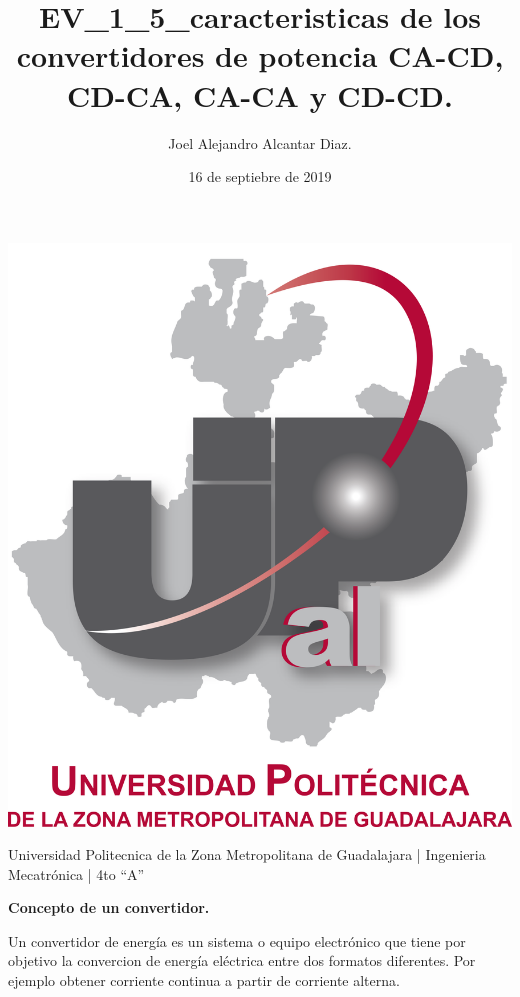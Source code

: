 \documentclass[spanish]{article}
\begin{document}
\title{EV\_1\_5\_caracteristicas de los convertidores de potencia CA-CD, CD-CA, CA-CA
y CD-CD.}

\author{Joel Alejandro Alcantar Diaz.}
\date{16 de septiebre de 2019}
\maketitle
\begin{center}
\includegraphics[scale=0.5]{1.png}\linebreak{}
\par\end{center}

Universidad Politecnica de la Zona Metropolitana de Guadalajara |
Ingenieria Mecatr\'onica | 4to ``A''\pagebreak{}
\begin{center}
\textbf{\LARGE{}Concepto de un convertidor.}{\LARGE\par}
\par\end{center}

Un convertidor de energ\'ia es un sistema o equipo electr\'onico que tiene
por objetivo la convercion de energ\'ia el\'ectrica entre dos formatos
diferentes. Por ejemplo obtener corriente continua a partir de corriente
alterna.\\
\end{document}
